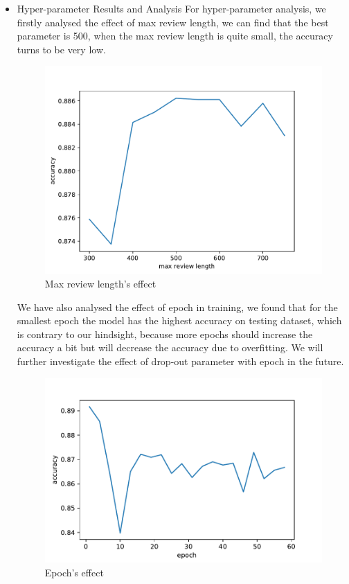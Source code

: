 \documentclass[11pt]{scrartcl}
\begin{document}
\begin{itemize}
	\item Hyper-parameter  Results and Analysis
	For hyper-parameter analysis, we firstly analysed the effect of max review length, we can find that the best parameter is 500, when the max review length is quite small, the accuracy turns to be very low.
	\begin{figure}[H]
	\centering
	\includegraphics[width=0.7\linewidth]{fig/maxlen.pdf}
	\caption{Max review length's effect}
	\label{maxlen}
\end{figure}
	We have also analysed the effect of epoch in training, we found that for the smallest epoch the model has the highest accuracy on testing dataset, which is contrary to our hindsight, because more epochs should increase the accuracy a bit but will decrease the accuracy due to overfitting. We will further investigate the effect of drop-out parameter with epoch in the future.
	\begin{figure}[H]
	\centering
	\includegraphics[width=0.7\linewidth]{fig/epoch.pdf}
	\caption{Epoch's effect}
	\label{epoch}
\end{figure}
\end{itemize}
\end{document}
